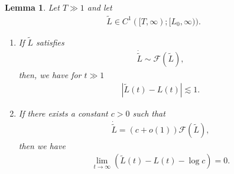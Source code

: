 \documentclass[reqno]{amsart}
\theoremstyle{plain}
\newtheorem{lemma}[theorem]{Lemma}
\theoremstyle{definition}
\numberwithin{equation}{section}
\begin{document}
\begin{lemma}\label{mathcalFyouode}
Let $T\gg 1$ and let
\begin{align*}
\tilde{L}\in C^1([T,\infty);[L_0,\infty)).
\end{align*}

\begin{enumerate}
\item If $\tilde{L}$ satisfies
\begin{align}\label{Ltildecomparable}
\dot{\tilde{L}}\sim\mathcal{F}(\tilde{L}),
\end{align}
then, we have for $t\gg 1$
\begin{align}\label{LtildeLookisaonaji}
\left|\tilde{L}(t)-L(t)\right|\lesssim1.
\end{align}
\item If there exists a constant $c>0$ such that 
\begin{align}\label{Ltildecass}
\dot{\tilde{L}}=\left(c+o(1)\right)\mathcal{F}(\tilde{L}),
\end{align}
then we have
\begin{align}\label{LtildeLsaga0}
\lim_{t\to\infty}\left(\tilde{L}(t)-L(t)-\log{c}\right)=0.
\end{align}
\end{enumerate}
\end{lemma}
\end{document}
